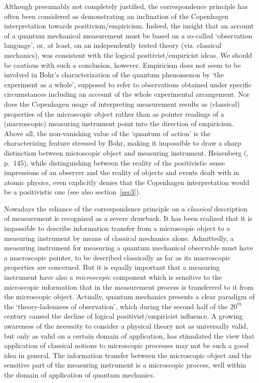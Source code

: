 \documentclass[12pt]{article}
\begin{document}
Although presumably not completely justified, the correspondence
principle has often been considered as demonstrating an
inclination of the Copenhagen interpretation towards
positivism/empiricism. Indeed, the insight that an account of a
quantum mechanical measurement must be based on a so-called
`observation language', or, at least, on an independently tested
theory (viz. classical mechanics), was consistent with the logical
positivist/empiricist ideas. We should be cautious with such a
conclusion, however. Empiricism does not seem to be involved in
Bohr's characterization of the quantum phenomenon by `the
experiment as a whole', supposed to refer to observations obtained
under specific circumstances including an account of the whole
experimental arrangement. Nor does the Copenhagen usage of
interpreting measurement results as (classical) properties of the
microscopic object rather than as pointer readings of a
(macroscopic) measuring instrument point into the direction of
empiricism. Above all, the non-vanishing value of the `quantum of
action' is the characterizing feature stressed by Bohr, making it
impossible to draw a sharp distinction between microscopic object
and measuring instrument. Heisenberg (\cite{Heis58c}, p.~145),
while distinguishing between the reality of the positivistic sense
impressions of an observer and the reality of objects and events
dealt with in atomic physics, even explicitly denies that the
Copenhagen interpretation would be a positivistic one (see also
section~\ref{sec3}).

Nowadays the reliance of the correspondence principle on a {\em
classical} description of measurement is recognized as a severe
drawback. It has been realized that it is impossible to describe
information transfer from a microscopic object to a measuring
instrument by means of classical mechanics alone. Admittedly, a
measuring instrument for measuring a quantum mechanical observable
must have a macroscopic pointer, to be described classically as
far as its macroscopic properties are concerned. But it is equally
important that a measuring instrument have also a {\em
microscopic} component which is sensitive to the microscopic
information that in the measurement process is transferred to it
from the microscopic object. Actually, quantum mechanics presents
a clear paradigm of the `theory-ladenness of observation', which
during the second half of the $20^{th}$ century caused the decline
of logical positivist/empiricist influence. A growing awareness of
the necessity to consider a physical theory not as universally
valid, but only as valid on a certain domain of application, has
stimulated the view that application of classical notions to
microscopic processes may not be such a good idea in general. The
information transfer between the microscopic object and the
sensitive part of the measuring instrument is a microscopic
process, well within the domain of application of quantum
mechanics.
\end{document}
